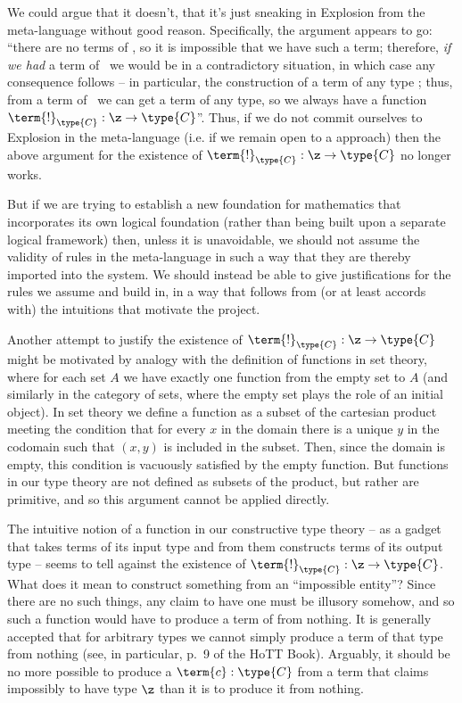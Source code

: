 We could argue that it doesn't, that it's just sneaking in Explosion from the meta-language without good reason.  Specifically, the argument appears to go: ``there are no terms of \z, so it is impossible that we have such a term; therefore, \emph{if we had} a term of \z\ we would be in a contradictory situation, in which case any consequence follows -- in particular, the construction of a term of any type ; thus, from a term of \z\ we can get a term of any type, so we always have a function $\term{!}_{\type{C}}:\z \to \type{C}$''.  Thus, if we do not commit ourselves to Explosion in the meta-language (i.e. if we remain open to a  approach) then the above argument for the existence of $\term{!}_{\type{C}}:\z \to \type{C}$ no longer works.

But if we are trying to establish a new foundation for mathematics that incorporates its own logical foundation (rather than being built upon a separate logical framework) then, unless it is unavoidable, we should not assume the validity of rules in the meta-language in such a way that they are thereby imported into the system.  We should instead be able to give justifications for the rules we assume and build in, in a way that follows from (or at least accords with) the intuitions that motivate the project.

Another attempt to justify the existence of $\term{!}_{\type{C}}:\z \to \type{C}$ might be motivated by analogy with the definition of functions in set theory, where for each set $A$ we have exactly one function from the empty set to $A$ (and similarly in the category of sets, where the empty set plays the role of an initial object).  In set theory we define a function as a subset of the cartesian product meeting the condition that for every $x$ in the domain there is a unique $y$ in the codomain such that $(x,y)$ is included in the subset.  Then, since the domain is empty, this condition is vacuously satisfied by the empty function.  But functions in our type theory are not defined as subsets of the product, but rather are primitive, and so this argument cannot be applied directly.

The intuitive notion of a function in our constructive type theory -- as a gadget that takes terms of its input type and from them constructs terms of its output type -- seems to tell against the existence of $\term{!}_{\type{C}}:\z \to \type{C}$.  What does it mean to construct something from an ``impossible entity''?  Since there are no such things, any claim to have one must be illusory somehow, and so such a function would have to produce a term of  from nothing.  It is generally accepted that for arbitrary types we cannot simply produce a term of that type from nothing (see, in particular, p.~9 of the HoTT Book).  Arguably, it should be no more possible to produce a $\term{c}:\type{C}$ from a term that claims impossibly to have type $\z$ than it is to produce it from nothing.


